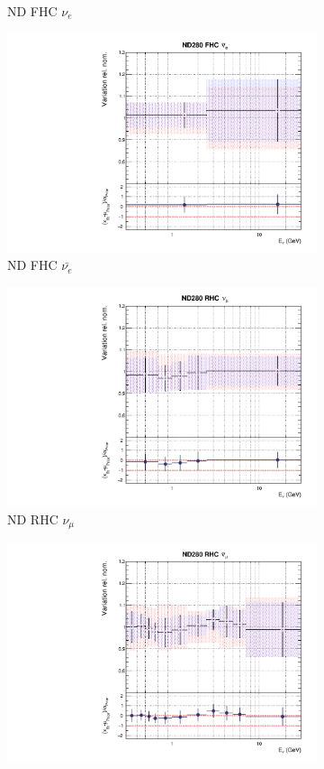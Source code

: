 \begin{figure}[t]
\begin{subfigure}{0.45\textwidth}
  \caption{ND FHC $\nu_e$}
\end{subfigure}
\begin{subfigure}{0.45\textwidth}
  \centering
  \includegraphics[width=0.75\linewidth]{figs/rhcmpdat248flux_3}
  \caption{ND FHC $\bar{\nu_{e}}$}
\end{subfigure}
\begin{subfigure}{0.45\textwidth}
  \centering
  \includegraphics[width=0.75\linewidth]{figs/rhcmpdat248flux_4}
  \caption{ND RHC $\nu_{\mu}$}
\end{subfigure}
\begin{subfigure}{0.45\textwidth}
  \centering
  \includegraphics[width=0.75\linewidth]{figs/rhcmpdat248flux_5}

\end{subfigure}
\end{figure}
